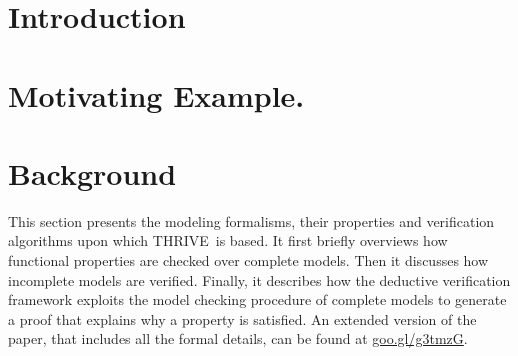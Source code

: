 \documentclass[runningheads,a4paper]{llncs}
\newcommand{\NAME}{THRIVE}
\begin{document}
\begin{abstract}
Model checking automatically verifies whether a model of the system under analysis satisfies a property of interest.
It returns \emph{true} if the property is satisfied, \emph{false} and a violating behavior if it is not. 
Three-valued model checking has been proposed to support verification when some portions of the model are unspecified. 
Differently from the classical two-valued case, it also returns a \emph{maybe} value and a possibly violating behavior if the property satisfaction depends on how the unspecified parts are refined.

When no violating or possibly violating behavior is returned, model checking does not usually provide the designer with any details about the reasons \emph{why} the property is satisfied.
This is the purpose of deductive verification.
Deductive verification frameworks produce a formal proof of the property satisfaction, but have only been studied for the two-valued case.
This paper proposes \NAME, a unified approach that enriches three-valued model checking with a deductive verification engine that generates proofs which explain why a \emph{true} or \emph{maybe} result is returned.
\end{abstract}

\section{Introduction}


\section{Motivating Example.} 
\label{sec:motivating}


\section{Background}
\label{sec:preliminaries}
This section presents the modeling formalisms, their properties and verification algorithms upon which \NAME\ is based. It first briefly overviews how functional properties are checked over complete models.
Then it discusses how incomplete models are verified.
Finally, it describes how the deductive verification framework exploits the model checking procedure of complete models to generate a proof that explains why a property is satisfied.
An extended version of the paper, that includes all the formal details, can be found at \url{goo.gl/g3tmzG}.
\end{document}
